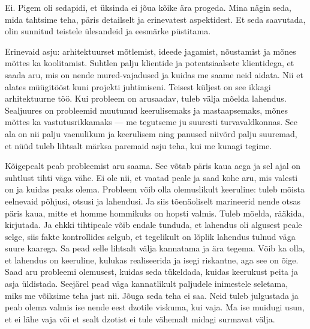 
Ei. Pigem oli sedapidi, et üksinda ei jõua kõike ära progeda. Mina nägin seda, mida 
tahtsime teha, päris detailselt ja erinevatest aspektidest. Et seda saavutada, olin sunnitud teistele ülesandeid ja 
eesmärke püstitama.


Erinevaid asju: arhitektuurset mõtlemist, ideede jagamist, nõustamist ja mõnes mõttes ka koolitamist. Suhtlen palju 
klientide ja potentsiaalsete klientidega, et saada aru, mis on nende mured-vajadused ja kuidas me saame neid aidata. Nii et alates müügitööst kuni projekti 
juhtimiseni. Teisest küljest on see ikkagi arhitektuurne töö. Kui probleem on  
arusaadav, tuleb välja mõelda lahendus. Sealjuures on probleemid muutunud keerulisemaks ja 
mastaapsemaks, mõnes mõttes ka vastutusrikkamaks --- me  
tegutseme ju suuresti turvavaldkonnas. See ala on nii palju 
vaenulikum ja keerulisem ning panused niivõrd palju suuremad, et nüüd tuleb
lihtsalt märksa paremaid asju teha, kui me kunagi tegime.


Kõigepealt peab probleemist aru saama. See võtab päris kaua aega ja sel ajal on suhtlust tihti väga vähe. Ei ole nii, et vaatad peale ja 
saad kohe aru, mis valesti on ja kuidas peaks olema. Probleem võib olla olemuslikult keeruline: tuleb mõista eelnevaid põhjusi, otsusi ja lahendusi. 
Ja siis tõenäoliselt marineerid nende 
otsas päris kaua, mitte et homme hommikuks on hopsti valmis. Tuleb mõelda, rääkida, kirjutada. Ja ehkki tihtipeale võib endale tunduda, et 
lahendus oli algusest peale selge, siis fakte kontrollides 
selgub, et tegelikult on lõplik lahendus tulnud väga suure kaarega. Sa pead selle lihtsalt välja kannatama ja ära tegema. Võib ka olla, et lahendus on keeruline, kulukas 
realiseerida ja isegi riskantne, aga see on õige. Saad aru probleemi olemusest, kuidas seda 
tükeldada, kuidas keerukust peita ja asja üldistada. Seejärel 
pead väga kannatlikult paljudele inimestele seletama, miks me võiksime teha 
just nii. Jõuga seda teha ei saa. Neid tuleb julgustada ja peab olema 
valmis ise nende eest dzotile viskuma, kui vaja. Ma ise muidugi usun, 
et ei lähe vaja või et sealt dzotist ei tule vähemalt midagi surmavat välja.

